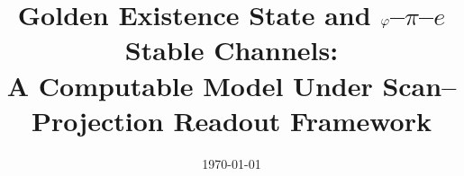 \documentclass[11pt,letterpaper]{article}
\title{Golden Existence State and $\varphi$--$\pi$--$e$ Stable Channels: \\\large A Computable Model Under Scan--Projection Readout Framework}
\author{}
\date{\today}
\begin{document}
\maketitle













\FloatBarrier
\appendix






\FloatBarrier

\end{document}
